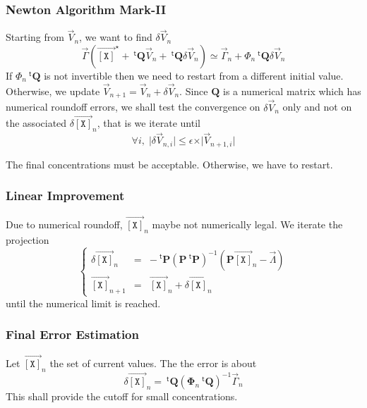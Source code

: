 \documentclass[aps,twocolumn]{revtex4}
\newcommand{\myconc}[1]{\left\lbrack #1 \right\rbrack}
\newcommand{\mychem}[1]{{\mathtt{#1}}}
\newcommand{\mymat}[1]{\boldsymbol{#1}}
\newcommand{\mytrn}[1]{{\!\!~^{\mathsf{t}}{#1}}}
\newcommand{\myvec}[1]{\overrightarrow{#1}}
\newcommand{\vecX}{\myvec{\myconc{\mychem{X}}}}
\begin{document}
\subsubsection{Newton Algorithm Mark-II}
Starting from $\vec{V}_{n}$, we want to find $\delta\vec{V}_n$
\begin{equation}
	\vec{\Gamma}\left(\vecX^\star +  \mytrn{\mymat{Q}}\vec{V}_n + \mytrn{\mymat{Q}}\delta\vec{V}_n\right)
	\simeq \vec{\Gamma}_{n} + \Phi_n  \mytrn{\mymat{Q}} \delta\vec{V}_n
\end{equation}
If $\Phi_n  \mytrn{\mymat{Q}}$ is not invertible then we need to restart from a different initial value.\\
Otherwise, we update $\vec{V}_{n+1}= \vec{V}_{n} + \delta\vec{V}_{n}$.
Since $\mymat{Q}$ is a numerical matrix which has numerical roundoff errors, we shall test the convergence
 on $\delta\vec{V}_{n}$ only and not on the associated $\delta \vecX_n$, that is
we iterate until
\begin{equation}
	\forall i, \; \vert\delta\vec{V}_{n,i}\vert \leq \epsilon \times \vert \vec{V}_{n+1,i}\vert
\end{equation}

The final concentrations must be acceptable. Otherwise,  we have to restart.


\subsubsection{Linear Improvement}
Due to numerical roundoff, $\vecX_n$ maybe not numerically legal.
We iterate the projection
\begin{equation}
	\left\lbrace
	\begin{array}{rcl}
	\delta \vecX_n & = & - \mytrn{\mymat{P}} \left(\mymat{P} \mytrn{\mymat{P}}\right)^{-1} \left( \mymat{P}\vecX_n - \vec{\Lambda} \right)\\
	\vecX_{n+1}    & = & \vecX_n + \delta\vecX_n
	\end{array}
	\right.
\end{equation}
until the numerical limit is reached.

\subsubsection{Final Error Estimation}
Let $\vecX_n$ the set of current values. The the error is about
\begin{equation}
	\delta \vecX_n = \mytrn{\mymat{Q}}\left(\mymat{\Phi}_n\mytrn{\mymat{Q}}\right)^{-1} \vec{\Gamma}_n
\end{equation}
This shall provide the cutoff for small concentrations.
\end{document}
